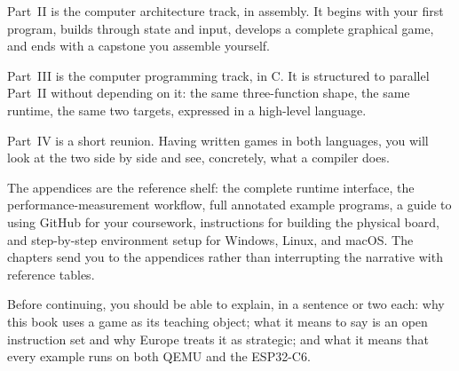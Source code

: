 Part~II is the computer architecture track, in \riscv assembly. It begins with
your first program, builds through state and input, develops a complete graphical
game, and ends with a capstone you assemble yourself.

Part~III is the computer programming track, in C. It is structured to parallel
Part~II without depending on it: the same three-function shape, the same runtime,
the same two targets, expressed in a high-level language.

Part~IV is a short reunion. Having written games in both languages, you will look
at the two side by side and see, concretely, what a compiler does.

The appendices are the reference shelf: the complete runtime interface,
the performance-measurement workflow, full annotated example programs, a guide to
using GitHub for your coursework, instructions for building the physical board,
and step-by-step environment setup for Windows, Linux, and macOS. The chapters
send you to the appendices rather than interrupting the narrative with reference
tables.

\begin{prgcheck}
Before continuing, you should be able to explain, in a sentence or two each: why
this book uses a game as its teaching object; what it means to say \riscv is an
open instruction set and why Europe treats it as strategic; and what it means
that every example runs on both QEMU and the ESP32\nobreakdash-C6.
\end{prgcheck}
